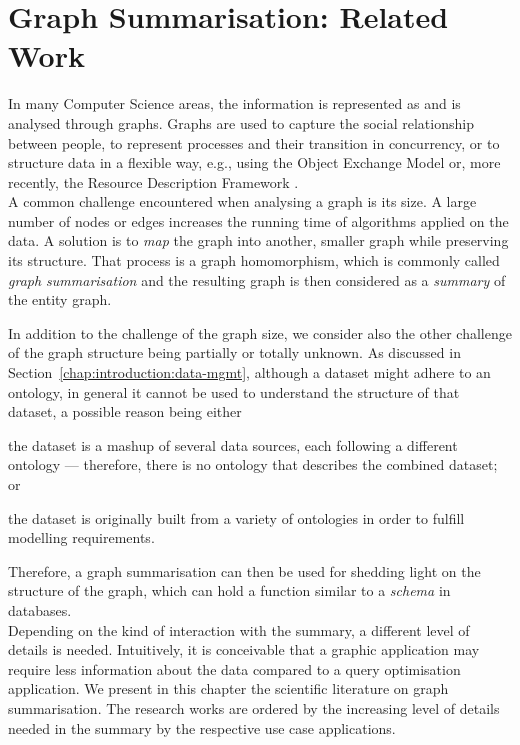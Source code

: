 \chapter{Graph Summarisation: Related Work}
\label{chap:graph-summary:related-work}

In many Computer Science areas, the information is represented as and is analysed through graphs. Graphs are used to capture the social relationship between people, to represent processes and their transition in concurrency, or to structure data in a flexible way, e.g., using the Object Exchange Model \cite{papakonstantinou:1995:oea} or, more recently, the Resource Description Framework \cite{rdfconcepts}.\\

A common challenge encountered when analysing a graph is its size. A large number of nodes or edges increases the running time of algorithms applied on the data. A solution is to \emph{map} the graph into another, smaller graph while preserving its structure. That process is a graph homomorphism, which is commonly called \emph{graph summarisation} and the resulting graph is then considered as a \emph{summary} of the entity graph.

In addition to the challenge of the graph size, we consider also the other challenge of the graph structure being partially or totally unknown. As discussed in Section~\ref{chap:introduction:data-mgmt}, although a dataset might adhere to an ontology, in general it cannot be used to understand the structure of that dataset, a possible reason being either
\begin{inparaenum}[(a)]
\item the dataset is a mashup of several data sources, each following a different ontology --- therefore, there is no ontology that describes the combined dataset; or
\item the dataset is originally built from a variety of ontologies in order to fulfill modelling requirements.
\end{inparaenum}
Therefore, a graph summarisation can then be used for shedding light on the structure of the graph, which can hold a function similar to a \emph{schema} in databases.\\

Depending on the kind of interaction with the summary, a different level of details is needed. Intuitively, it is conceivable that a graphic application may require less information about the data compared to a query optimisation application. We present in this chapter the scientific literature on graph summarisation. The research works are ordered by the increasing level of details needed in the summary by the respective use case applications.

